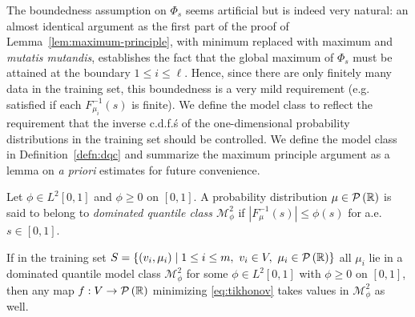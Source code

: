 \documentclass[letterpaper]{article} %
\begin{document}

The boundedness assumption on $\Phi_s$ seems artificial but is indeed very natural: an almost identical argument as the first part of the proof of Lemma~\ref{lem:maximum-principle}, with minimum replaced with maximum and \emph{mutatis mutandis}, establishes the fact that the global maximum of $\Phi_s$ must be attained at the boundary $1\leq i\leq \ell$.  Hence, since there are only finitely many data in the training set, this boundedness is a very mild requirement (e.g. satisfied if each $F_{\mu_i}^{-1} \left( s \right)$ is finite). We define the model class to reflect the requirement that the inverse c.d.f.\'s of the one-dimensional probability distributions in the training set should be controlled. We define the model class in Definition~\ref{defn:dqc} and summarize the maximum principle argument as a lemma on \emph{a priori} estimates for future convenience. 

\begin{definition}
\label{defn:dqc}
  Let $\phi\in L^2 \left[ 0,1 \right]$ and $\phi\geq 0$ on $\left[ 0,1 \right]$. A probability distribution $\mu\in\P\left( \mathbb{R} \right)$ is said to belong to \emph{dominated quantile class $\mathcal{M}_{\phi}^2$} if $\left|F_{\mu}^{-1}\left( s \right)\right|\leq \phi \left( s \right)$ for a.e. $s\in \left[0,1\right]$.
\end{definition}

\begin{lemma}
  \label{lem:apriori-estimates}
  If in the training set $S=\left\{ \left( v_i,\mu_i \right)\mid 1\leq i\leq m,\,\,v_i\in V,\,\,\mu_i\in\P\left( \mathbb{R} \right) \right\}$ all $\mu_i$ lie in a dominated quantile model class $\mathcal{M}_{\phi}^2$ for some $\phi\in L^2 \left[ 0,1 \right]$ with $\phi\geq 0$ on $\left[ 0,1 \right]$, then any map $f:V\rightarrow\P\left( \mathbb{R} \right)$ minimizing \eqref{eq:tikhonov} takes values in $\mathcal{M}_{\phi}^2$ as well.
\end{lemma}
\end{document}
